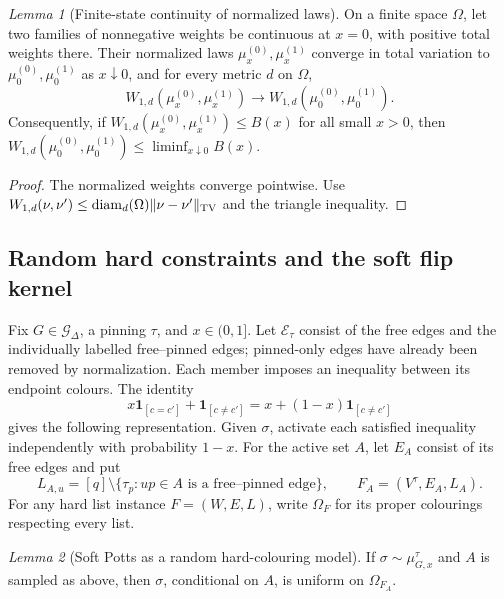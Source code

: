 \documentclass[11pt,reqno]{article}
\theoremstyle{plain}
\newtheorem{lemma}[theorem]{Lemma}
\theoremstyle{definition}
\theoremstyle{remark}
\newtheorem{lemma}[lemma]{Lemma}
\theoremstyle{definition}
\theoremstyle{remark}
\newcommand{\one}[1]{\mathbf{1}_{\left[#1\right]}}   %
\newcommand{\Deg}{\Delta}                        %
\newcommand{\Wd}{W_{1,d}}                        %
\newcommand{\colours}{[q]}                        %
\newcommand{\Gdeg}{\mathcal{G}_{\Deg}}
\newcommand{\mupin}[3]{\mu_{#1,#3}^{#2}}
\begin{document}
\begin{lemma}[Finite-state continuity of normalized laws]
\label{lem:finite-endpoint-closure}
On a finite space \(\Omega\), let two families of nonnegative weights be
continuous at \(x=0\), with positive total weights there.  Their normalized
laws \(\mu^{(0)}_x,\mu^{(1)}_x\) converge in total variation to
\(\mu^{(0)}_0,\mu^{(1)}_0\) as
\(x\downarrow0\), and for every metric \(d\) on \(\Omega\),
\[
  \Wd(\mu^{(0)}_x,\mu^{(1)}_x)\longrightarrow
  \Wd(\mu^{(0)}_0,\mu^{(1)}_0).
\]
Consequently, if \(\Wd(\mu^{(0)}_x,\mu^{(1)}_x)\le B(x)\) for all small
\(x>0\), then \(\Wd(\mu^{(0)}_0,\mu^{(1)}_0)\le\liminf_{x\downarrow0}B(x)\).
\end{lemma}

\begin{proof}
The normalized weights converge pointwise.  Use
\(\Wd(\nu,\nu')\le\operatorname{diam}_d(\Omega)
\|\nu-\nu'\|_{\rm TV}\) and the triangle inequality.
\end{proof}

\subsection{Random hard constraints and the soft flip kernel}
\label{sec:soft-flip-interface}

Fix \(G\in\Gdeg\), a pinning \(\tau\), and \(x\in(0,1]\).
Let \(\mathcal E_\tau\) consist of the free edges and the individually
labelled free--pinned edges; pinned-only edges have already been removed
by normalization.  Each member imposes an inequality between its endpoint
colours.  The identity
\begin{equation}\label{eq:active-identity}
  x\one{c=c'}+\one{c\ne c'}=x+(1-x)\one{c\ne c'}
\end{equation}
gives the following representation.  Given \(\sigma\), activate each
satisfied inequality independently with probability \(1-x\).
For the active set \(A\), let \(E_A\) consist of its free edges and put
\[
  L_{A,u}=\colours\setminus
    \{\tau_p:up\in A\text{ is a free--pinned edge}\},
  \qquad F_A=(V^\tau,E_A,L_A).
\]
For any hard list instance \(F=(W,E,L)\), write \(\Omega_F\) for its
proper colourings respecting every list.

\begin{lemma}[Soft Potts as a random hard-colouring model]
\label{lem:active-rep}
If \(\sigma\sim\mupin{G}{\tau}{x}\) and \(A\) is sampled as above,
then \(\sigma\), conditional on \(A\), is uniform on \(\Omega_{F_A}\).
\end{lemma}
\end{document}
